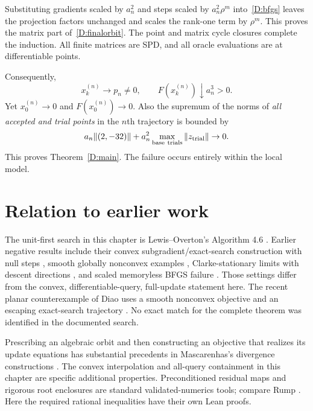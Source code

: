 Substituting gradients scaled by $a_n^2$ and steps scaled by $a_n^2\rho^m$ into~\eqref{D:bfgs} leaves the projection factors unchanged and scales the rank-one term by $\rho^m$. This proves the matrix part of~\eqref{D:finalorbit}. The point and matrix cycle closures complete the induction. All finite matrices are SPD, and all oracle evaluations are at differentiable points.

Consequently,
\[
 x_k^{(n)}\to p_n\ne0,\qquad
 F(x_k^{(n)})\downarrow a_n^3>0.
\]
Yet $x_0^{(n)}\to0$ and $F(x_0^{(n)})\to0$. Also the supremum of the norms of \emph{all accepted and trial points} in the $n$th trajectory is bounded by
\[
 a_n\|(2,-32)\|+a_n^2\max_{\rm base\ trials}\|z_{\rm trial}\|\to0.
\]
This proves Theorem~\ref{D:main}. The failure occurs entirely within the local model.


\endgroup


\section*{Relation to earlier work}
The unit-first search in this chapter is Lewis--Overton's Algorithm 4.6 \cite{LO}. Earlier negative results include their convex subgradient/exact-search construction with null steps \cite{NEG_LO08}, smooth globally nonconvex examples \cite{NEG_M04,NEG_M07,NEG_M14,NEG_DAI02,NEG_DAI13}, Clarke-stationary limits with descent directions \cite{NEG_LZ15}, and scaled memoryless BFGS failure \cite{NEG_AO21}. Those settings differ from the convex, differentiable-query, full-update statement here. The recent planar counterexample of Diao uses a smooth nonconvex objective and an escaping exact-search trajectory \cite{NEG_DIAO26}. No exact match for the complete theorem was identified in the documented search.

Prescribing an algebraic orbit and then constructing an objective that realizes its update equations has substantial precedents in Mascarenhas's divergence constructions \cite{NEG_M04,NEG_M07,NEG_M14}. The convex interpolation and all-query containment in this chapter are specific additional properties. Preconditioned residual maps and rigorous root enclosures are standard validated-numerics tools; compare Rump \cite[Theorem 13.3]{NEG_RUMP10}. Here the required rational inequalities have their own Lean proofs.
